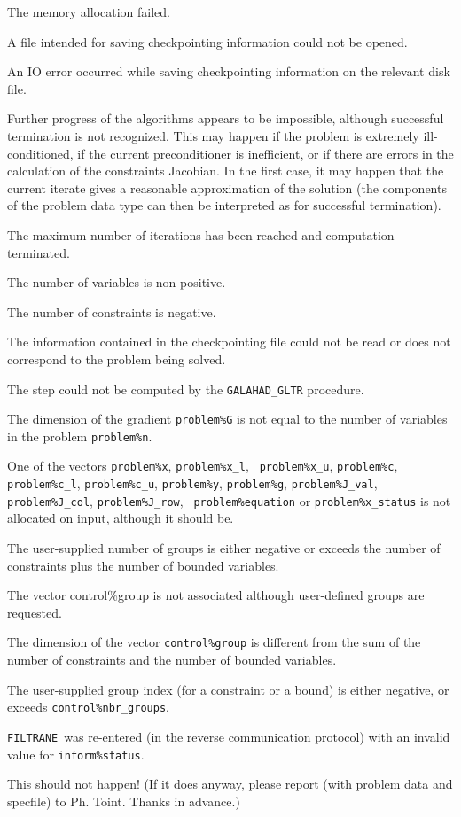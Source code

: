 \documentclass{galahad}
\newcommand{\packagename}{FILTRANE}
\newcommand{\filtrane}{{\tt \packagename}}
\begin{document}
\begin{description}

 The memory allocation failed.

 A file intended for saving checkpointing information could not be
opened.

 An IO error occurred while saving checkpointing information on 
the relevant disk file.

 Further progress of the algorithms appears to be impossible,
although successful termination is not recognized. This may happen if the
problem is extremely ill-conditioned, if the current preconditioner is
inefficient, or if there are errors in the calculation of the constraints
Jacobian.  In the first case, it may happen that the current iterate gives a
reasonable approximation of the solution (the components of the problem data
type can then be interpreted as for successful termination).

 The maximum number of iterations has been reached and computation
terminated.

 The number of variables is non-positive.

 The number of constraints is negative.

 The information contained in the checkpointing file could not
be read or does not correspond to the problem being solved.

 The step could not be computed by the {\tt GALAHAD\_GLTR} procedure.

 The dimension of the gradient {\tt problem\%G} is not equal to
the number of variables in the problem {\tt problem\%n}.

 One of the vectors {\tt problem\%x}, {\tt problem\%x\_l}, {\tt
problem\%x\_u}, {\tt problem\%c}, {\tt problem\%c\_l}, {\tt problem\%c\_u}, 
{\tt problem\%y}, {\tt problem\%g}, {\tt problem\%J\_val}, {\tt
problem\%J\_col}, {\tt problem\%J\_row}, {\tt
problem\%equation} or {\tt problem\%x\_status} is not allocated on input,
although it should be.

 The user-supplied number of groups is either negative
or exceeds the number of constraints plus the number of bounded variables.

 The vector control\%group is not associated although user-defined
groups are requested.

 The dimension of the vector {\tt control\%group} is different
from the sum of the number of constraints and the number of bounded
variables.

 The user-supplied group index (for a constraint or a bound) is
either negative, or exceeds  {\tt control\%nbr\_groups}.

 \filtrane\ was re-entered (in the reverse communication
protocol) with an invalid value for {\tt inform\%status}.

 This should not happen! (If it does anyway, please
report (with problem data and specfile) to Ph. Toint. Thanks in advance.)
\end{description}
\end{document}
